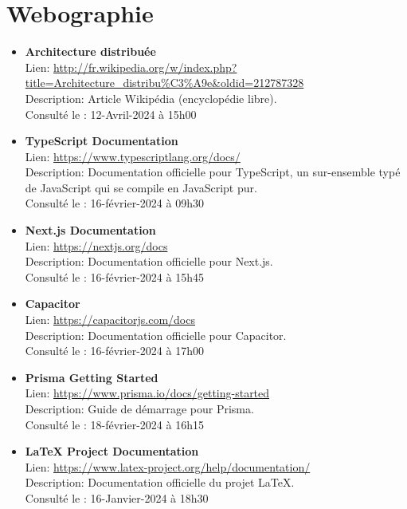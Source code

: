 \documentclass[12pt,french]{extreport}
\begin{document}
\printbibliography
\nocite{roques2004uml}
\label{sec:bibliographie}

\chapter*{Webographie}
\label{sec:webographie}
\begin{itemize}
    \item \textbf{Architecture distribuée} \\
    Lien: \url{http://fr.wikipedia.org/w/index.php?title=Architecture_distribu%C3%A9e&oldid=212787328} \\
    Description: Article Wikipédia (encyclopédie libre). \\
    Consulté le : 12-Avril-2024 à 15h00

    \item \textbf{TypeScript Documentation} \\
    Lien: \url{https://www.typescriptlang.org/docs/} \\
    Description: Documentation officielle pour TypeScript, un sur-ensemble typé de JavaScript qui se compile en JavaScript pur. \\
    Consulté le : 16-février-2024 à 09h30

    \item \textbf{Next.js Documentation} \\
    Lien: \url{https://nextjs.org/docs} \\
    Description: Documentation officielle pour Next.js. \\
    Consulté le : 16-février-2024 à 15h45

    \item \textbf{Capacitor} \\
    Lien: \url{https://capacitorjs.com/docs} \\
    Description: Documentation officielle pour Capacitor. \\
    Consulté le : 16-février-2024 à 17h00

    \item \textbf{Prisma Getting Started} \\
    Lien: \url{https://www.prisma.io/docs/getting-started} \\
    Description: Guide de démarrage pour Prisma. \\
    Consulté le : 18-février-2024 à 16h15

    \item \textbf{LaTeX Project Documentation} \\
    Lien: \url{https://www.latex-project.org/help/documentation/} \\
    Description: Documentation officielle du projet LaTeX. \\
    Consulté le : 16-Janvier-2024 à 18h30


\end{itemize}
\end{document}
